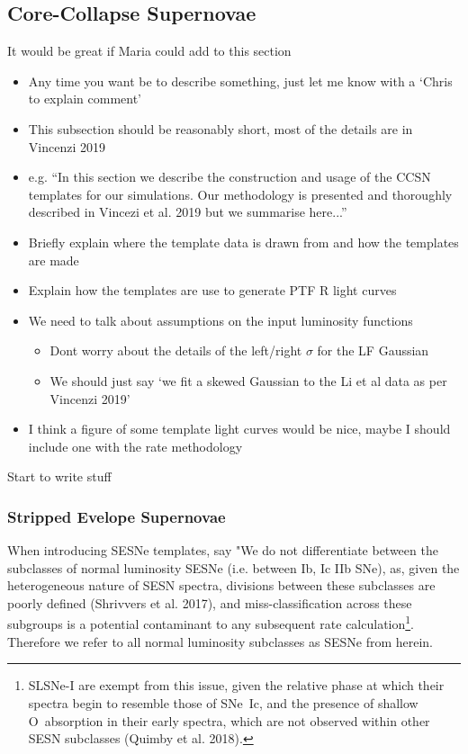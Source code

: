 \documentclass[a4paper,fleqn,usenatbib]{mnras}
\newcommand{\angus}[1]{\color{JungleGreen}#1\color{black}}
\newcommand{\chris}[1]{\color{orange}#1\color{black}}
\newcommand{\maria}[1]{\color{RubineRed}#1\color{black}}
\begin{document}
\subsection{Core-Collapse Supernovae}
\chris{It would be great if Maria could add to this section}
\begin{itemize}
    \item Any time you want be to describe something, just let me know with a `Chris to explain comment'
    \item This subsection should be reasonably short, most of the details are in Vincenzi 2019
    \item e.g. ``In this section we describe the construction and usage of the CCSN templates for our simulations. Our methodology is presented and thoroughly described in Vincezi et al. 2019 but we summarise here...''
    \item Briefly explain where the template data is drawn from and how the templates are made
    \item Explain how the templates are use to generate PTF R light curves
    \item We need to talk about assumptions on the input luminosity functions
        \begin{itemize}
            \item Dont worry about the details of the left/right $\sigma$ for the LF Gaussian
            \item We should just say `we fit a skewed Gaussian to the Li et al data as per Vincenzi 2019' 
        \end{itemize}
    \item I think a figure of some template light curves would be nice, maybe I should include one with the rate methodology
\end{itemize}

\maria{Start to write stuff}
\subsubsection{Stripped Evelope Supernovae}
\angus{When introducing SESNe templates, say "We do not differentiate between the subclasses of normal luminosity SESNe (i.e. between Ib, Ic IIb SNe), as, given the heterogeneous nature of SESN spectra, divisions between these subclasses are poorly defined (Shrivvers et al. 2017), and miss-classification across these subgroups is a potential contaminant to any subsequent rate calculation\footnote{\angus{SLSNe-I are exempt from this issue, given the relative phase at which their spectra begin to resemble those of SNe~Ic, and the presence of shallow O\ion{II}~absorption in their early spectra, which are not observed within other SESN subclasses (Quimby et al. 2018).}}. Therefore we refer to all normal luminosity subclasses as SESNe from herein.}
\end{document}
